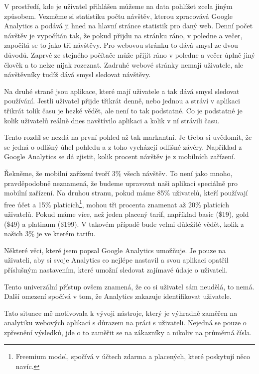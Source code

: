 \documentclass[bc,male,java,dept456]{diploma}						%
\begin{document}
V prostředí, kde je uživatel přihlášen můžeme na data pohlížet zcela jiným způsobem. Vezměme si statistiku počtu návštěv, kterou zpracovává Google Analytics a podává ji hned na hlavní stránce statistik pro daný web. Denní počet návštěv je vypočítán tak, že pokud přijdu na stránku ráno, v poledne a večer, započítá se to jako tři návštěvy. Pro webovou stránku to dává smysl ze dvou důvodů. Zaprvé ze stejného počítače může přijít ráno v poledne a večer úplně jiný člověk a to nelze nijak rozeznat. Zadruhé webové stránky nemají uživatele, ale návštěvníky tudíž dává smysl sledovat návštěvy. 

Na druhé straně jsou aplikace, které mají uživatele a tak dává smysl sledovat po\-u\-ží\-vá\-ní. Jestli uživatel přijde třikrát denně, nebo jednou a stráví v aplikaci třikrát tolik času je hezké vědět, ale není to tak podstatné. Co je podstatné je kolik uživatelů reálně dnes navštívilo aplikaci a kolik v ní strávili času.

Tento rozdíl se nezdá na první pohled až tak markantní. Je třeba si uvědomit, že se jedná o odlišný úhel pohledu a z toho vycházejí odlišné závěry. Například z Google Analytics se dá zjistit, kolik procent návštěv je z mobilních zařízení. 

Řekněme, že mobilní zařízení tvoří 3\% všech návštěv. To není jako mnoho, pra\-vdě\-po\-do\-bně neznamená, že budeme upravovat naši aplikaci speciálně pro mobilní zařízení. Na druhou stranu, pokud máme 85\% uživatelů, kteří používají free účet a 15\% platících\footnote{Freemium model\cite{freemium}, spočívá v účtech zdarma a placených, které poskytují něco navíc.}, mohou tři procenta znamenat až 20\% platících uživatelů. Pokud máme více, než jeden placený tarif, například basic (\$19), gold (\$49) a platinum (\$199). V takovém případě bude velmi důležité vědět, kolik z našich 3\% je ve kterém tarifu.

Některé věci, které jsem popsal Google Analytics umožňuje. Je pouze na uživateli, aby si svoje Analytics co nejlépe nastavil a svou aplikaci opatřil příslušným nastavením, které umožní sledovat zajímavé údaje o uživateli.

Tento univerzální přístup ovšem znamená, že co si uživatel sám neudělá, to nemá. Další omezení spočívá v tom, že Analytics zakazuje identifikovat uživatele.

Tato situace mě motivovala k vývoji nástroje, který je výhradně zaměřen na analytiku webových aplikací s důrazem na práci s uživateli. Nejedná se pouze o zpřesnění výsledků, jde o to zaměřit se na zákazníky a nikoliv na průměrná čísla.
\end{document}
